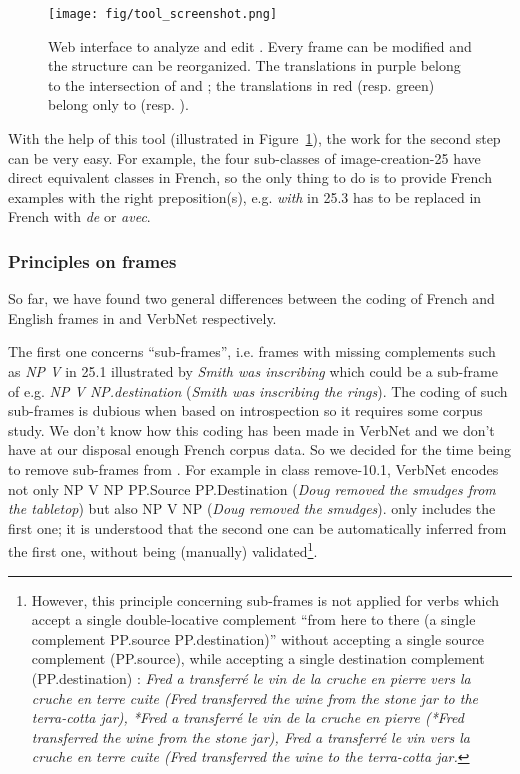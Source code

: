 \begin{figure}
 \centering
 \texttt{[image: fig/tool\_screenshot.png]}
 \caption{\label{tool}Web interface to analyze and edit \verbenet{}. Every
    frame can be modified and the structure can be reorganized.  The translations
    in purple belong to the intersection of \Clvf{} and \Clg{}; the translations in
    red (resp. green) belong only to \Clvf{} (resp. \Clg{}).}
\end{figure}


With the help of this tool (illustrated in Figure~\ref{tool}),  the work for
the second step can be very easy. For example, the four sub-classes of
image-creation-25 have direct equivalent classes in French, so the only thing
to do is to provide French examples with the right preposition(s), e.g.
\emph{with} in 25.3 has to be replaced in French with \emph{de} or \emph{avec}.

\subsubsection{Principles on frames}\label{princp}

So far, we have found two general differences between the  coding of French and
English frames in \verbenet{} and VerbNet respectively.

The first one concerns ``sub-frames'', i.e. frames with missing complements such
as \emph{NP V} in 25.1 illustrated by \emph{Smith was inscribing} which could
be  a sub-frame of e.g. \emph{NP V NP.destination} (\emph{Smith was inscribing
the rings}). The coding of such sub-frames is dubious when based on
introspection so it requires some corpus study.  We don't know how this coding
has been made in VerbNet and we don't have at our disposal enough French corpus
data.  So we decided for the time being to remove sub-frames from \verbenet{}.
For example in class remove-10.1, VerbNet encodes not only NP V NP PP.Source
PP.Destination (\emph{Doug removed the smudges from the tabletop}) but also NP
V NP (\emph{Doug removed the smudges}). \verbenet{} only includes the first
one; it is understood that the second one can be automatically inferred from
the first one, without being (manually) validated\footnote{However, this
principle concerning sub-frames is not applied for verbs which accept a single
double-locative complement ``from here to there (a single complement PP.source
PP.destination)''  without accepting a single source complement (PP.source),
while accepting a single destination complement (PP.destination) : \emph{Fred a
transferré le vin de la cruche en pierre vers la cruche en terre cuite  (Fred
transferred the wine from the stone jar to the terra-cotta jar), *Fred a
transferré le vin de la cruche en pierre (*Fred transferred the wine from the
stone jar), Fred a transferré le vin vers la cruche en terre cuite (Fred
transferred the wine to the terra-cotta  jar.}}.

